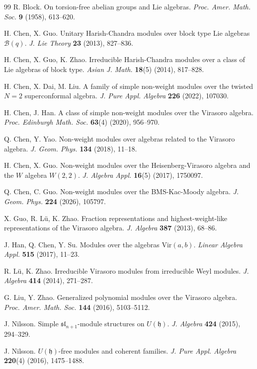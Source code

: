 \documentclass[a4paper]{amsart}
\numberwithin{equation}{section}
\begin{document}
\begin{thebibliography}{99}
R. Block.
On torsion-free abelian groups and Lie algebras.
{\it Proc. Amer. Math. Soc.} {\bf 9} (1958), 613--620.

H. Chen, X. Guo.
Unitary Harish-Chandra modules over block type Lie algebras $\mathcal{B}(q)$.
{\it J. Lie Theory} {\bf 23} (2013), 827--836.

H. Chen, X. Guo, K. Zhao.
Irreducible Harish-Chandra modules over a class of Lie algebras of block type.
{\it Asian J. Math.} {\bf 18}(5) (2014), 817--828.

H. Chen, X. Dai, M. Liu.
A family of simple non-weight modules over the twisted $N=2$ superconformal algebra.
{\it J. Pure Appl. Algebra} {\bf 226} (2022), 107030.

H. Chen, J. Han.
A class of simple non-weight modules over the Virasoro algebra.
{\it Proc. Edinburgh Math. Soc.} {\bf 63}(4) (2020), 956--970.

Q. Chen, Y. Yao.
Non-weight modules over algebras related to the Virasoro algebra.
{\it J. Geom. Phys.} {\bf 134} (2018), 11--18.

H. Chen, X. Guo.
Non-weight modules over the Heisenberg-Virasoro algebra and the $W$ algebra $W(2,2)$.
{\it J. Algebra Appl.} {\bf 16}(5) (2017), 1750097.

Q. Chen, C. Guo.
Non-weight modules over the BMS-Kac-Moody algebra.
{\it J. Geom. Phys.} {\bf 224} (2026), 105797.

X. Guo, R. Lü, K. Zhao.
Fraction representations and highest-weight-like representations of the Virasoro algebra.
{\it J. Algebra} {\bf 387} (2013), 68--86.

J. Han, Q. Chen, Y. Su.
Modules over the algebras $\mathrm{Vir}(a,b)$.
{\it Linear Algebra Appl.} {\bf 515} (2017), 11--23.

R. Lü, K. Zhao.
Irreducible Virasoro modules from irreducible Weyl modules.
{\it J. Algebra} {\bf 414} (2014), 271--287.

G. Liu, Y. Zhao.
Generalized polynomial modules over the Virasoro algebra.
{\it Proc. Amer. Math. Soc.} {\bf 144} (2016), 5103--5112.

J. Nilsson.
Simple $\mathfrak{sl}_{n+1}$-module structures on $U(\mathfrak h)$.
{\it J. Algebra} {\bf 424} (2015), 294--329.

J. Nilsson.
$U(\mathfrak h)$-free modules and coherent families.
{\it J. Pure Appl. Algebra} {\bf 220}(4) (2016), 1475--1488.


\end{thebibliography}
\end{document}
